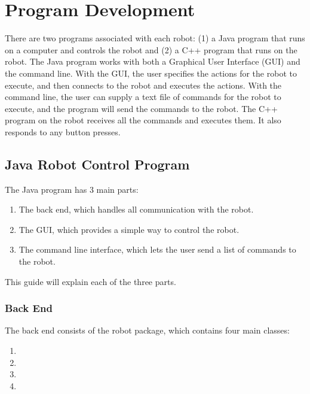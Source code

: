 \documentclass[letterpaper,10pt,english]{sphinxmanual}
\begin{document}
\chapter{Program Development}
\label{ProgramDevelopment:program-development}\label{ProgramDevelopment::doc}
There are two programs associated with each robot: (1) a Java program that runs on a computer and controls the robot and (2) a C++ program that runs on the robot. The Java program works with both a Graphical User Interface (GUI) and the command line. With the GUI, the user specifies the actions for the robot to execute, and then connects to the robot and executes the actions. With the command line, the user can supply a text file of commands for the robot to execute, and the program will send the commands to the robot. The C++ program on the robot receives all the commands and executes them. It also responds to any button presses.


\section{Java Robot Control Program}
\label{ProgramDevelopment:java-robot-control-program}
The Java program has 3 main parts:
\begin{enumerate}
\item {} 
The back end, which handles all communication with the robot.

\item {} 
The GUI, which provides a simple way to control the robot.

\item {} 
The command line interface, which lets the user send a list of commands to the robot.

\end{enumerate}

This guide will explain each of the three parts.


\subsection{Back End}
\label{ProgramDevelopment:back-end}
The back end consists of the robot package, which contains four main classes:
\begin{enumerate}
\item {} 

\item {} 

\item {} 

\item {} 

\end{enumerate}
\end{document}
